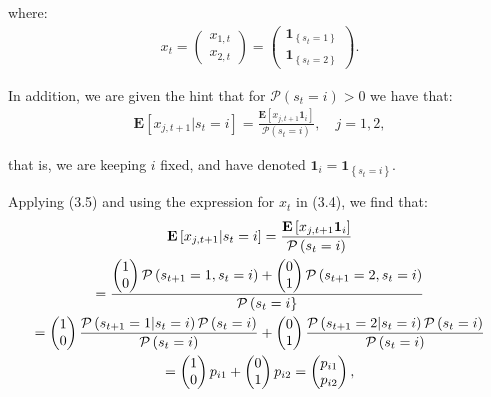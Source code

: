 \documentclass[11pt,a4paper,oneside]{article}
\newcommand{\lp}{\left(}
\newcommand{\rp}{\right)}
\newcommand{\rb}{\right]}
\newcommand{\lb}{\left[}
\newcommand{\lc}{\left\{}
\newcommand{\rc}{\right\}}
\newcommand{\ee}{\mathbf{E}}
\newcommand{\pp}{\mathcal{P}}
\newcommand{\ii}{\mathbf{1}}
\begin{document}
where:
\begin{align}
    x_t = 
        \begin{pmatrix}
        x_{1,t} \\
        x_{2,t}
        \end{pmatrix}
        =
        \begin{pmatrix}
            \ii_{\lc s_t = 1\rc} \\
            \ii_{\lc s_t = 2\rc}
        \end{pmatrix}.
\end{align}

In addition, we are given the hint that for $\pp\lp s_t = i\rp > 0$ we have that:
\begin{align}
    \ee\lb x_{j, t+1} \vert s_t = i\rb = \frac{\ee\lb x_{j, t+1} \ii_i\rb}{\pp\lp s_t = i\rp}, \quad j = 1, 2,
\end{align}

that is, we are keeping $i$ fixed, and have denoted $\ii_i = \ii_{\lc s_t = i\rc}$.

Applying (3.5) and using the expression for $x_t$ in (3.4), we find that:
\begin{gather}
    \ee\lb x_{j, t+1} \vert s_t = i\rb 
        = \frac{\ee\lb x_{j, t+1} \ii_i\rb}{\pp\lp s_t = i\rp} \notag \\
        = \frac{\begin{pmatrix} 1 \\ 0\end{pmatrix} \pp\lp s_{t+1} = 1, s_t = i\rp + \begin{pmatrix} 0 \\ 1\end{pmatrix} \pp\lp s_{t+1} = 2, s_t = i\rp}{\pp\lp s_t = i\rc} \notag \\
        = \begin{pmatrix} 1 \\ 0\end{pmatrix} \frac{\pp\lp s_{t+1} = 1\vert s_t = i\rp \pp\lp s_t = i\rp}{\pp\lp s_t = i\rp} + \begin{pmatrix} 0 \\ 1\end{pmatrix}\frac{\pp\lp s_{t+1} = 2 \vert s_t = i\rp \pp\lp s_t = i\rp}{\pp\lp s_t = i\rp} \notag \\
        = \begin{pmatrix} 1 \\ 0\end{pmatrix} p_{i1} + \begin{pmatrix} 0 \\ 1\end{pmatrix} p_{i2} = \begin{pmatrix} p_{i1} \\ p_{i2} \end{pmatrix},
\end{gather}
\end{document}
